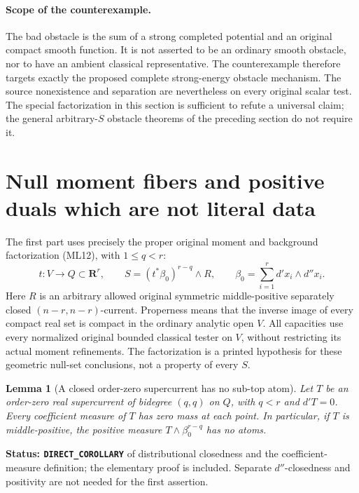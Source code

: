 \documentclass[11pt,a4paper]{article}
\numberwithin{equation}{section}
\newtheorem{lemma}[theorem]{Lemma}
\theoremstyle{definition}
\theoremstyle{remark}
\begin{document}
\paragraph{Scope of the counterexample.}
The bad obstacle is the sum of a strong completed potential
and an original compact smooth function.  It is not asserted
to be an ordinary smooth obstacle, nor to have an ambient
classical representative.  The counterexample therefore
targets exactly the proposed complete strong-energy
obstacle mechanism.  The source nonexistence and separation
are nevertheless on every original scalar test.  The
special factorization in this section is sufficient to
refute a universal claim; the general arbitrary-$S$ obstacle
theorems of the preceding section do not require it.



\section{Null moment fibers and positive duals which are not literal data}
\label{sec:r12-null-fibers-nonliteral-duals}

The first part uses precisely the proper original moment and
background factorization (ML12), with $1\leq q<r$:
\[
 t:V\longrightarrow Q\subset\mathbf R^r,\qquad
 S=(t^*\beta_0)^{r-q}\wedge R,\qquad
 \beta_0=\sum_{i=1}^r d'x_i\wedge d''x_i.
 \tag{NF1}
\]
Here $R$ is an arbitrary allowed original symmetric middle-positive
separately closed $(n-r,n-r)$-current. Properness means that the
inverse image of every compact real set is compact in the ordinary
analytic open $V$. All capacities use every normalized original
bounded classical tester on $V$, without restricting its actual
moment refinements. The factorization is a printed hypothesis for
these geometric null-set conclusions, not a property of every $S$.

\begin{lemma}[A closed order-zero supercurrent has no sub-top atom]
\label{lem:r12-closed-current-no-atom}
Let $T$ be an order-zero real supercurrent of bidegree $(q,q)$
on $Q$, with $q<r$ and $d'T=0$. Every coefficient measure of
$T$ has zero mass at each point. In particular, if $T$ is
middle-positive, the positive measure
$T\wedge\beta_0^{r-q}$ has no atoms.
\end{lemma}

\noindent\textbf{Status: \texttt{DIRECT\_COROLLARY}} of
distributional closedness and the coefficient-measure definition;
the elementary proof is included. Separate $d''$-closedness and
positivity are not needed for the first assertion.
\end{document}
